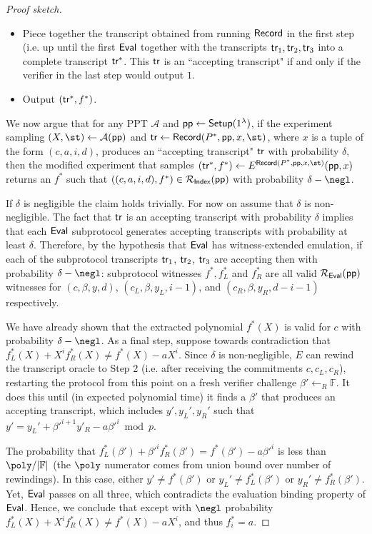 \documentclass{article}
\theoremstyle{definition}
\begin{document}
\begin{proof}[Proof sketch]
\begin{itemize}
\item Piece together the transcript obtained from running $\textsf{{Record}}$ in the first step (i.e. up until the first $\textsf{{Eval}}$ together with the transcripts $\textsf{{tr}}_1, \textsf{{tr}}_2, \textsf{{tr}}_3$ into a complete transcript $\textsf{{tr}}^*$. This $\textsf{{tr}}$ is an ``accepting transcript" if and only if the verifier in the last step would output $1$. 

\item Output $(\textsf{{tr}}^*, f^*)$.  
\end{itemize}

We now argue that for any PPT $\mathcal{A}$ and $\textsf{pp} \leftarrow \textsf{{Setup}}(1^\lambda)$, if the experiment sampling $(X, \st) \leftarrow \mathcal{A}(\params)$ and $\tr \leftarrow \pro{Record}(P^*, \params, x, \st)$, where $x$ is a tuple of the form $(c, a, i, d)$, produces an ``accepting transcript" $\textsf{{tr}}$ with probability $\delta$, then the modified experiment that samples $(\tr^*, f^*) \leftarrow E^{\textsf{Record}(P^*, \params, x, \st)}(\params, x)$ returns an $f^*$ such that $((c, a, i, d), f^*) \in \mathcal{R_\textsf{Index}}(\textsf{pp})$ with probability $\delta - \negl$. 

If $\delta$ is negligible the claim holds trivially. For now on assume that $\delta$ is non-negligible. 
The fact that $\textsf{{tr}}$ is an accepting transcript with probability $\delta$ implies that each $\textsf{{Eval}}$ subprotocol generates accepting transcripts with probability at least $\delta$. Therefore, by the hypothesis that $\textsf{{Eval}}$ has witness-extended emulation, if each of the subprotocol transcripts $\textsf{{tr}}_1$, $\textsf{{tr}}_2$, $\textsf{{tr}}_3$ are accepting then with probability $\delta - \negl$: subprotocol witnesses $f^*, f_L^*$ and $f_R^*$ are all valid $\mathcal{R_\textsf{Eval}}(\textsf{pp})$ witnesses for $(c, \beta, y, d)$, $(c_L, \beta, y_L, i-1)$, and $(c_R, \beta, y_R, d - i - 1)$ respectively. 

We have already shown that the extracted polynomial $f^*(X)$ is valid for $c$ with probability $\delta - \negl$. As a final step, suppose towards contradiction that $f_L^*(X) + X^i f_R^*(X) \neq f^*(X) - a X^i$. Since $\delta$ is non-negligible, $E$ can rewind the transcript oracle to Step 2 (i.e. after receiving the commitments $c, c_L, c_R$), restarting the protocol from this point on a fresh verifier challenge $\beta' \leftarrow_R \mathbb{F}$. It does this until (in expected polynomial time) it finds a $\beta'$ that produces an accepting transcript, which includes $y', y_L', y_R'$ such that $y' = y_L' + \beta'^{i+1} y'_R - a \beta'^i \bmod p$.

The probability that $f_L^*(\beta') + \beta'^i f_R^*(\beta') = f^*(\beta') - a \beta'^i$ is less than $\poly / |\mathbb{F}|$ (the $\poly$ numerator comes from union bound over number of rewindings). In this case, either $y' \neq f^*(\beta')$ or $y_L' \neq f^*_L(\beta')$ or $y_R' \neq f^*_R(\beta')$. Yet, $\textsf{{Eval}}$ passes on all three, which contradicts the evaluation binding property of $\textsf{{Eval}}$. Hence, we conclude that except with $\negl$ probability $f_L^*(X) + X^i f_R^*(X) \neq f^*(X) - a X^i$, and thus $f^*_i = a$. 

\end{proof}
\end{document}
